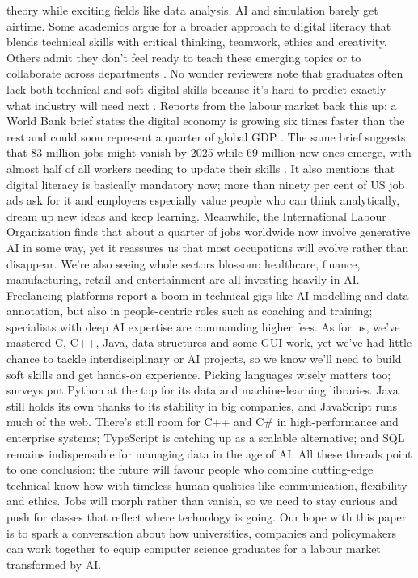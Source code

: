 \documentclass[final,5p,times,twocolumn]{elsarticle}
\begin{document}
theory while exciting fields like data analysis, AI and simulation barely get airtime. Some academics argue for a broader approach to digital literacy that blends technical skills with critical thinking, teamwork, ethics and creativity. Others admit they don't feel ready to teach these emerging topics or to collaborate across departments \cite{M5_2_huang2025digital}. No wonder reviewers note that graduates often lack both technical and soft digital skills because it's hard to predict exactly what industry will need next \cite{M4_1_tee2024demand}. Reports from the labour market back this up: a World Bank brief states the digital economy is growing six times faster than the rest and could soon represent a quarter of global GDP \cite{M11_8_elzir2024building}. The same brief suggests that 83 million jobs might vanish by 2025 while 69 million new ones emerge, with almost half of all workers needing to update their skills \cite{M11_8_elzir2024building}. It also mentions that digital literacy is basically mandatory now; more than ninety per cent of US job ads ask for it and employers especially value people who can think analytically, dream up new ideas and keep learning. Meanwhile, the International Labour Organization finds that about a quarter of jobs worldwide now involve generative AI in some way, yet it reassures us that most occupations will evolve rather than disappear. We're also seeing whole sectors blossom: healthcare, finance, manufacturing, retail and entertainment are all investing heavily in AI. Freelancing platforms report a boom in technical gigs like AI modelling and data annotation, but also in people-centric roles such as coaching and training; specialists with deep AI expertise are commanding higher fees. As for us, we've mastered C, C++, Java, data structures and some GUI work, yet we've had little chance to tackle interdisciplinary or AI projects, so we know we'll need to build soft skills and get hands-on experience. Picking languages wisely matters too; surveys put Python at the top for its data and machine-learning libraries. Java still holds its own thanks to its stability in big companies, and JavaScript runs much of the web. There's still room for C++ and C\# in high-performance and enterprise systems; TypeScript is catching up as a scalable alternative; and SQL remains indispensable for managing data in the age of AI. All these threads point to one conclusion: the future will favour people who combine cutting-edge technical know-how with timeless human qualities like communication, flexibility and ethics. Jobs will morph rather than vanish, so we need to stay curious and push for classes that reflect where technology is going. Our hope with this paper is to spark a conversation about how universities, companies and policymakers can work together to equip computer science graduates for a labour market transformed by AI.
\end{document}
